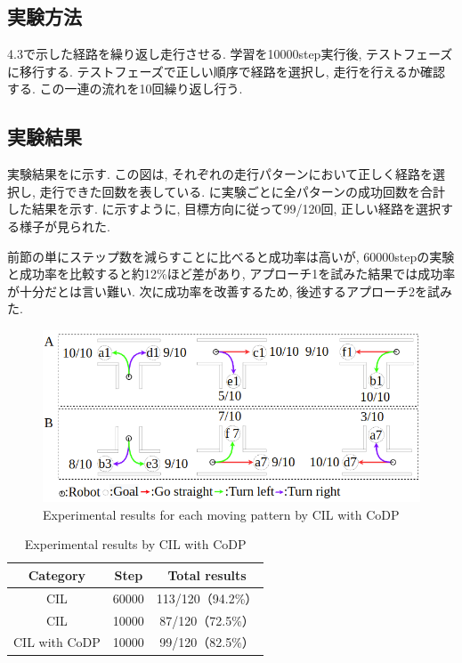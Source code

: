 \subsection{実験方法}
4.3で示した経路を繰り返し走行させる. 学習を10000step実行後, テストフェーズに移行する. テストフェーズで正しい順序で経路を選択し, 走行を行えるか確認する. この一連の流れを10回繰り返し行う.
\subsection{実験結果}
実験結果をに示す. この図は, それぞれの走行パターンにおいて正しく経路を選択し, 走行できた回数を表している. に実験ごとに全パターンの成功回数を合計した結果を示す. 
に示すように, 目標方向に従って99/120回, 正しい経路を選択する様子が見られた. 
\par
前節の単にステップ数を減らすことに比べると成功率は高いが, 60000stepの実験と成功率を比較すると約12\%ほど差があり, アプローチ1を試みた結果では成功率が十分だとは言い難い. 次に成功率を改善するため, 後述するアプローチ2を試みた.

\vspace{0.5cm}

\begin{figure}[hbtp]
  \centering
  \includegraphics[keepaspectratio, scale=0.47]
      {images/10000step_act1.0.png}
  \caption{Experimental results for each moving pattern by CIL with CoDP}
  \label{Fig:10000step_act1.0}
\end{figure}  


\begin{table}[hbtp]
  \caption{Experimental results by CIL with CoDP}
  \label{table:result3}
  \centering
  \begin{tabular}{|c|c|c|}
    \hline
    Category & Step & Total results\\
    \hline
    CIL & 60000 & 113/120（94.2\%）\\
    \hline
    CIL & 10000 & 87/120（72.5\%）\\
    \hline
    CIL with CoDP & 10000 & 99/120（82.5\%）\\
    \hline
  \end{tabular}
\end{table}

